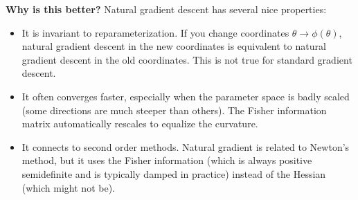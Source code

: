 \vspace{1.5em}

\textbf{Why is this better?} Natural gradient descent has several nice properties:

\begin{itemize}
\item It is invariant to reparameterization. If you change coordinates $\theta \to \phi(\theta)$, natural gradient descent in the new coordinates is equivalent to natural gradient descent in the old coordinates. This is not true for standard gradient descent.

\item It often converges faster, especially when the parameter space is badly scaled (some directions are much steeper than others). The Fisher information matrix automatically rescales to equalize the curvature.

\item It connects to second order methods. Natural gradient is related to Newton's method, but it uses the Fisher information (which is always positive semidefinite and is typically damped in practice) instead of the Hessian (which might not be).
\end{itemize}

\vspace{1.5em}

